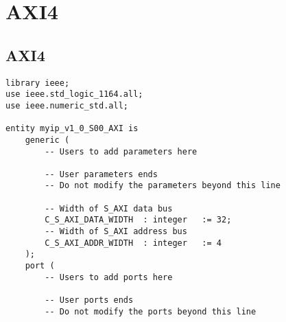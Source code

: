 \chapter{ AXI4}\label{aped.C}
 
 \section{AXI4}

\begin{lstlisting}
library ieee;
use ieee.std_logic_1164.all;
use ieee.numeric_std.all;

entity myip_v1_0_S00_AXI is
	generic (
		-- Users to add parameters here

		-- User parameters ends
		-- Do not modify the parameters beyond this line

		-- Width of S_AXI data bus
		C_S_AXI_DATA_WIDTH	: integer	:= 32;
		-- Width of S_AXI address bus
		C_S_AXI_ADDR_WIDTH	: integer	:= 4
	);
	port (
		-- Users to add ports here

		-- User ports ends
		-- Do not modify the ports beyond this line


\end{lstlisting}
